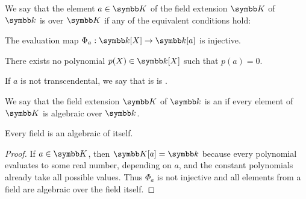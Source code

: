 \begin{definition}\label{def:transcendetal_element}\cite[454]{Knapp2016BAlg}
  We say that the element \( a \in \K \) of the field extension \( \K \) of \( \Kl \) is  over \( \K \) if any of the equivalent conditions hold:
  \begin{defenum}
     The evaluation map \( \Phi_a: \Kl[X] \to \Kl[a] \) is injective.

     There exists no polynomial \( p(X) \in \Kl[X] \) such that \( p(a) = 0 \).
  \end{defenum}

  If \( a \) is not transcendental, we say that is is .
\end{definition}

\begin{definition}\label{def:algebraic_extension}\cite[456]{Knapp2016BAlg}
  We say that the field extension \( \K \) of \( \Kl \) is an  if every element of \( \K \) is algebraic over \( \Kl \).
\end{definition}

\begin{proposition}\label{thm:field_elements_are_algebraic}
  Every field is an algebraic of itself.
\end{proposition}
\begin{proof}
  If \( a \in \K \), then \( \K[a] = \Kl \) because every polynomial evaluates to some real number, depending on \( a \), and the constant polynomials already take all possible values. Thus \( \Phi_a \) is not injective and all elements from a field are algebraic over the field itself.
\end{proof}


